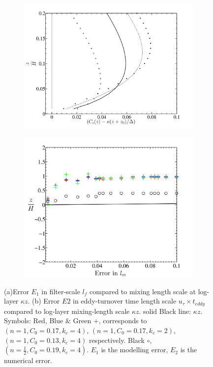 \begin{figure}
        \centering
        \begin{subfigure}[t]{0.55\textwidth}
                \includegraphics[width=\linewidth]{Fig2/Smag2b_abs.pdf}
                \caption{}
                \label{fig:error1}
        \end{subfigure}%
        \centering
        \begin{subfigure}[t]{0.45\textwidth}
                \includegraphics[width=\linewidth]{Fig2/shear_filter_n123.pdf}
                \caption{}
                \label{fig:error2}
        \end{subfigure}
\caption[Errors contributing in log-layer mismatch]{(a)Error $E_{1}$ in filter-scale $l_f$ compared to mixing length scale at log-layer $\kappa z$. (b) Error $E2$ in eddy-turnover time length scale $u_{\tau} \times t_{eddy}$ compared to log-layer mixing-length scale $\kappa z$. solid Black line: $\kappa z$. Symbols: Red, Blue $\&$ Green $+$, corresponds to $(n = 1, C_0 = 0.17, k_c = 4)$, $(n = 1, C_0 = 0.17,k_c = 2)$, $(n = 1, C_0 = 0.13, k_c = 4)$ respectively. Black $\circ$, $(n = \frac{1}{2}, C_0 = 0.19, k_c = 4)$. $E_1$ is the modelling error, $E_2$ is the numerical error.}
                \label{fig:shear1}
\end{figure}

